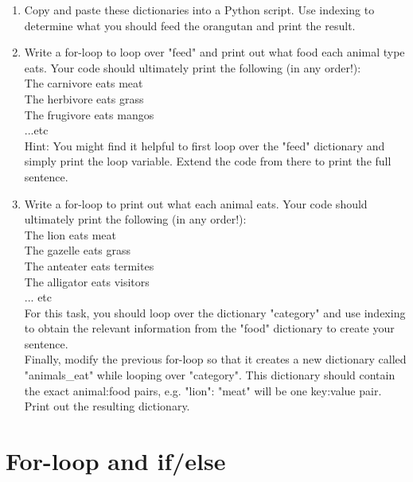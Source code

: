 \documentclass{article}[12pt]
\begin{document}
\begin{enumerate}
	\begin{enumerate}
        \item Copy and paste these dictionaries into a Python script. Use indexing to determine what you should feed the orangutan and print the result.
        \item Write a for-loop to loop over "feed" and print out what food each animal type eats. Your code should ultimately print the following (in any order!):\\
        The carnivore eats meat \\
        The herbivore eats grass \\
        The frugivore eats mangos \\
        ...etc \\
        \noindent Hint: You might find it helpful to first loop over the "feed" dictionary and simply print the loop variable. Extend the code from there to print the full sentence.
        \item Write a for-loop to print out what each animal eats. Your code should ultimately print the following (in any order!):\\
        The lion eats meat \\
        The gazelle eats grass \\ 
        The anteater eats termites \\
        The alligator eats visitors \\ 
            ... etc \\
        \noindent For this task, you should loop over the dictionary "category" and use indexing to obtain the relevant information from the "food" dictionary to create your sentence.
        \\ Finally, modify the previous for-loop so that it creates a new dictionary called "animals\_eat" while looping over "category". This dictionary should contain the exact animal:food pairs, e.g. "lion": "meat" will be one key:value pair. Print out the resulting dictionary.
    \end{enumerate}
\end{enumerate}

		   
			
\vspace{2.25cm}

\section{For-loop and if/else}
\end{document}
